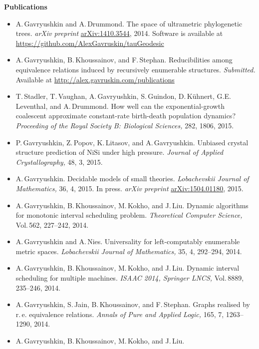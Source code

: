 \documentclass[12pt]{article}
\begin{document}
\centerline{\bf Publications}
\begin{itemize}
\item A.\,Gavryushkin and A.\,Drummond. 
	The space of ultrametric phylogenetic trees. 
	{\em arXiv preprint}
	\href{http://arxiv.org/abs/1410.3544}{arXiv:1410.3544}, 2014.	
	Software is available at\\ 
	\href{https://github.com/AlexGavruskin/tauGeodesic}{https://github.com/AlexGavruskin/tauGeodesic}
\item A.\,Gavryushkin, B.\,Khoussainov, and F.\,Stephan. Reducibilities
	among equivalence relations induced by 
	recursively enumerable structures. {\em Submitted.}
	Available at
	\href{http://alex.gavruskin.com/publications}{http://alex.gavruskin.com/publications}
\item T.\,Stadler, T.\,Vaughan, A.\,Gavryushkin, S.\,Guindon, 
	D.\,K\"uhnert, G.E.\,Leventhal, and A.\,Drummond.
	How well can the exponential-growth coalescent approximate 
	constant-rate birth-death population dynamics? {\em Proceeding of the
	Royal Society B: Biological Sciences,} 282, 1806, 2015.	
\item P.\,Gavryushkin, Z.\,Popov, K.\,Litasov, and A.\,Gavryushkin.
	Unbiased crystal structure prediction of $\mathrm{NiSi}$ under high
	pressure. {\em Journal of Applied Crystallography,} 48, 3, 2015.		
\item A.\,Gavryushkin. Decidable models of small theories. 
	{\em Lobachevskii Journal of Mathematics,} 36, 4, 2015. In press. 
	{\em arXiv preprint}
	\href{http://arxiv.org/abs/1504.01180}{arXiv:1504.01180}, 2015.
\item A.\,Gavryushkin, B.\,Khoussainov, M.\,Kokho, and J.\,Liu. 
	Dynamic algorithms for monotonic interval scheduling problem.
	{\em Theoretical Computer Science,} Vol.\,562, 227--242, 2014.
\item A.\,Gavryushkin and A.\,Nies. Universality for left-computably enumerable  metric spaces.
	{\em Lobachevskii Journal of Mathematics,} 35, 4, 292--294, 2014.
\item A.\,Gavryushkin, B.\,Khoussainov, M.\,Kokho, and J.\,Liu.
	Dynamic interval scheduling for multiple machines. {\em ISAAC 2014,
	Springer LNCS,} Vol.\,8889, 235--246, 2014. 	
\item A.\,Gavryushkin, S.\,Jain, B.\,Khoussainov, and F.\,Stephan. 
	Graphs realised by r.\,e. equivalence relations. 
	{\em Annals of Pure and Applied Logic,} 165, 7, 1263--1290, 2014.
\item A.\,Gavryushkin, B.\,Khoussainov, M.\,Kokho, and J.\,Liu. 

\end{itemize}
\end{document}
